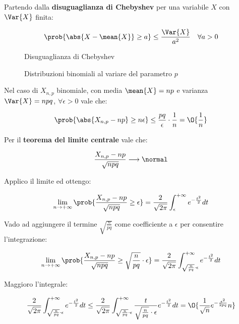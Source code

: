 \documentclass[\main/main.tex]{subfiles}
\begin{document}
Partendo dalla \textbf{disuguaglianza di Chebyshev} per una variabile \(X\) con \(\Var{X}\) finita:

\begin{figure}
  \[
    \prob{\abs{X-\mean{X}} \geq a} \leq \frac{\Var{X}}{a^2} \quad \forall a > 0
  \]
  \caption{Disuguaglianza di Chebyshev}
\end{figure}

\begin{figure}
  \caption{Distribuzioni binomiali al variare del parametro \(p\)}
\end{figure}

Nel caso di \(X_{n,p}\) binomiale, con media \(\mean{X} = np\) e varianza \(\Var{X} = npq\), \(\forall \epsilon > 0\) vale che:

\[
  \prob{\abs{X_{n,p} - np} \geq n\epsilon} \leq \frac{pq}{\epsilon}\cdot \frac{1}{n} = \O{\frac{1}{n}}
\]

Per il \textbf{teorema del limite centrale} vale che:

\[
  \frac{X_{n,p} - np}{\sqrt{npq}} \longrightarrow \normal
\]

Applico il limite ed ottengo:

\[
  \lim_{n\rightarrow+\infty} \prob{\frac{X_{n,p} - np}{\sqrt{npq}}\geq \epsilon} = \frac{2}{\sqrt{2\pi}} \int_{\epsilon}^{+\infty} e^{-\frac{t^2}{2}} dt
\]

Vado ad aggiungere il termine \(\sqrt{\frac{n}{pq}}\) come coefficiente a \(\epsilon \) per consentire l'integrazione:

\[
  \lim_{n\rightarrow+\infty} \prob{\frac{X_{n,p} - np}{\sqrt{npq}}\geq \sqrt{\frac{n}{pq}}\cdot \epsilon} = \frac{2}{\sqrt{2\pi}} \int_{\sqrt{\frac{n}{pq}}\cdot \epsilon}^{+\infty} e^{-\frac{t^2}{2}} dt
\]

Maggioro l'integrale:

\[
  \frac{2}{\sqrt{2\pi}} \int_{\sqrt{\frac{n}{pq}}\cdot \epsilon}^{+\infty} e^{-\frac{t^2}{2}} dt \leq \frac{2}{\sqrt{2\pi}} \int_{\sqrt{\frac{n}{pq}}\cdot \epsilon}^{+\infty} \frac{t}{\sqrt{\frac{n}{pq}}\cdot \epsilon}e^{-\frac{t^2}{2}} dt = \O{\frac{1}{\sqrt{n}} e^{-\frac{\epsilon^2}{2pq}}n}
\]
\end{document}
